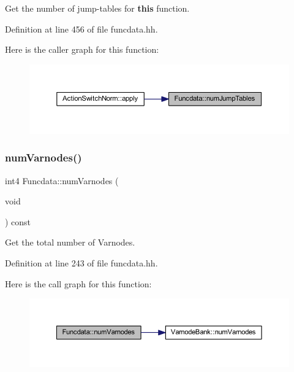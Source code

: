 Get the number of jump-\/tables for {\bfseries{this}} function. 



Definition at line 456 of file funcdata.\+hh.

Here is the caller graph for this function\+:
\nopagebreak
\begin{figure}[H]
\begin{center}
\leavevmode
\includegraphics[width=350pt]{class_funcdata_a30603a803c816264c105023c3456bcd7_icgraph}
\end{center}
\end{figure}
\mbox{\label{class_funcdata_a4a3390320b74e47d309f27fe6fd1d7e4}} 
\subsubsection{\texorpdfstring{numVarnodes()}{numVarnodes()}}
{\footnotesize\ttfamily int4 Funcdata\+::num\+Varnodes (\begin{DoxyParamCaption}\item[{void}]{ }\end{DoxyParamCaption}) const\hspace{0.3cm}{\ttfamily [inline]}}



Get the total number of Varnodes. 



Definition at line 243 of file funcdata.\+hh.

Here is the call graph for this function\+:
\nopagebreak
\begin{figure}[H]
\begin{center}
\leavevmode
\includegraphics[width=350pt]{class_funcdata_a4a3390320b74e47d309f27fe6fd1d7e4_cgraph}
\end{center}
\end{figure}
\mbox{\label{class_funcdata_a07ddc6cd232b4a101968d960fda9b965}} 
